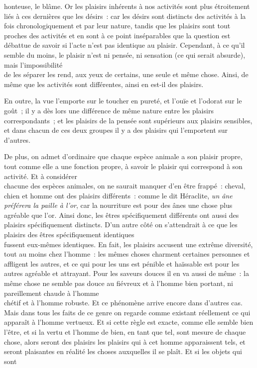 \documentclass[french,twoside]{book} %
\begin{document}
honteuse, le blâme. Or les plaisirs inhérents à nos activités sont plus étroitement liés à ces dernières que les désirs : car les désirs sont distincts des activités à la fois chronologiquement et par leur nature, tandis que les plaisirs sont tout proches des activités et en sont à ce point inséparables que la question est débattue de savoir si l’acte n’est pas identique au plaisir. Cependant, à ce qu’il semble du moins, le plaisir n’est ni pensée, ni sensation (ce qui serait absurde), mais l’impossibilité \\
de les séparer les rend, aux yeux de certains, une seule et même chose. Ainsi, de même que les activités sont différentes, ainsi en est-il des plaisirs.\par
 En outre, la vue l’emporte sur le toucher en pureté, et l’ouïe et l’odorat sur le goût ; il y a dès lors une différence de même nature entre les plaisirs correspondants ; et les plaisirs de la pensée sont supérieurs aux plaisirs sensibles, et dans chacun de ces deux groupes il y a des plaisirs qui l’emportent sur d’autres.\par
De plus, on admet d’ordinaire que chaque espèce animale a son plaisir propre, tout comme elle a une fonction propre, à savoir le plaisir qui correspond à son activité. Et à considérer \\
chacune des espèces animales, on ne saurait manquer d’en être frappé : cheval, chien et homme ont des plaisirs différents : comme le dit Héraclite, {\itshape un âne préférera la paille à l’or}, car la nourriture est pour des ânes une chose plus agréable que l’or. Ainsi donc, les êtres spécifiquement différents ont aussi des plaisirs spécifiquement distincts. D’un autre côté on s’attendrait à ce que les plaisirs des êtres spécifiquement identiques \\
fussent eux-mêmes identiques. En fait, les plaisirs accusent une extrême diversité, tout au moins chez l’homme : les mêmes choses charment certaines personnes et affligent les autres, et ce qui pour les uns est pénible et haïssable est pour les autres agréable et attrayant. Pour les saveurs douces il en va aussi de même : la même chose ne semble pas douce au fiévreux et à l’homme bien portant, ni pareillement chaude à l’homme \\
chétif et à l’homme robuste. Et ce phénomène arrive encore dans d’autres cas. Mais dans tous les faits de ce genre on regarde comme existant réellement ce qui apparaît à l’homme vertueux. Et si cette règle est exacte, comme elle semble bien l’être, et si la vertu et l’homme de bien, en tant que tel, sont mesure de chaque chose, alors seront des plaisirs les plaisirs qui à cet homme apparaissent tels, et seront plaisantes en réalité les choses auxquelles il se plaît. Et si les objets qui sont \\
\end{document}
